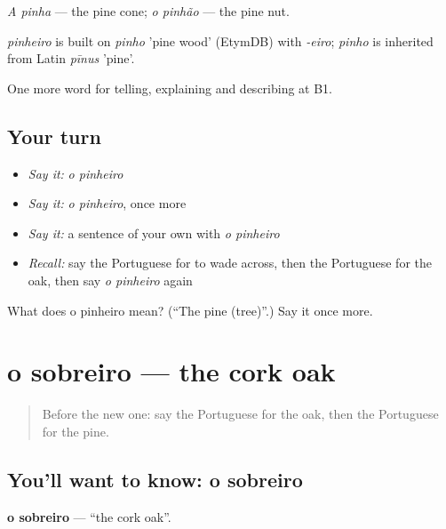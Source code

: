 \emph{A pinha} — the pine cone; \emph{o pinhão} — the pine nut.

\begin{cousinweb}
\emph{pinheiro} is built on \emph{pinho} 'pine wood' (EtymDB) with \emph{-eiro}; \emph{pinho} is inherited from Latin \emph{pīnus} 'pine'.
\end{cousinweb}

\begin{grammarlens}[title={What you've built}]
One more word for telling, explaining and describing at B1.
\end{grammarlens}

\subsection*{Your turn}
\begin{itemize}
\raggedright
  \item \emph{Say it:} \emph{o pinheiro}
  \item \emph{Say it:} \emph{o pinheiro}, once more
  \item \emph{Say it:} a sentence of your own with \emph{o pinheiro}
  \item \emph{Recall:} say the Portuguese for to wade across, then the Portuguese for the oak, then say \emph{o pinheiro} again
\end{itemize}

\begin{tcolorbox}[breakable,colback=teal!4,colframe=teal!35!black,title={Before you move on}]
What does o pinheiro mean? (\textquotedblleft{}The pine (tree)\textquotedblright{}.) Say it once more.
\end{tcolorbox}
\section[o sobreiro]{o sobreiro — the cork oak}

\label{lesson:PT-C457-sobreiro}



\begin{quote}
Before the new one: say the Portuguese for the oak, then the Portuguese for the pine.
\end{quote}

\subsection*{You'll want to know: o sobreiro}
\textbf{o sobreiro} — \textquotedblleft{}the cork oak\textquotedblright{}.

